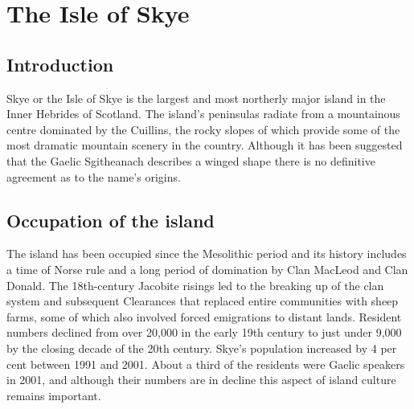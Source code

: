 \documentclass{book}
\begin{document}
\tableofcontents

\chapter{The Isle of Skye}

\section{Introduction}
Skye or the Isle of Skye is the largest and most northerly major island
in the Inner Hebrides of Scotland. The island's peninsulas radiate from
a mountainous centre dominated by the Cuillins, the rocky slopes of
which provide some of the most dramatic mountain scenery in the country.
Although it has been suggested that the Gaelic Sgitheanach describes a
winged shape there is no definitive agreement as to the name's origins.

\section{Occupation of the island}
The island has been occupied since the Mesolithic period and its history
includes a time of Norse rule and a long period of domination by Clan
MacLeod and Clan Donald. The 18th-century Jacobite risings led to the
breaking up of the clan system and subsequent Clearances that replaced
entire communities with sheep farms, some of which also involved forced
emigrations to distant lands. Resident numbers declined from over 20,000
in the early 19th century to just under 9,000 by the closing decade of
the 20th century. Skye's population increased by 4 per cent between 1991
and 2001. About a third of the residents were Gaelic speakers in 2001,
and although their numbers are in decline this aspect of island culture
remains important.

\end{document}
